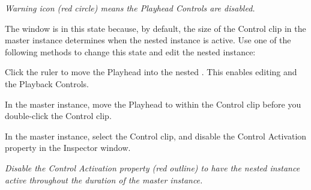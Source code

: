 {\itshape Warning icon (red circle) means the  Playhead Controls are disabled.}

The  window is in this state because, by default, the size of the Control clip in the master  instance determines when the nested  instance is active. Use one of the following methods to change this state and edit the nested  instance\+:


\begin{DoxyItemize}
\item Click the  ruler to move the  Playhead into the nested . This enables editing and the  Playback Controls.
\item In the master  instance, move the  Playhead to within the Control clip before you double-\/click the Control clip.
\item In the master  instance, select the Control clip, and disable the Control Activation property in the Inspector window.
\end{DoxyItemize}



{\itshape Disable the Control Activation property (red outline) to have the nested  instance active throughout the duration of the master  instance.} 